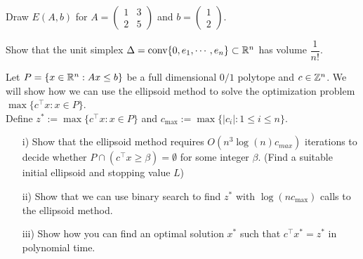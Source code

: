 \documentclass[11pt]{article}
\begin{document}
\problem
Draw $E(A,b)$ for $A = \begin{pmatrix} 1 & 3  \\ 2 & 5 \end{pmatrix}$ and $b  = \begin{pmatrix} 1   \\ 2 \end{pmatrix}$.

\problem
Show that the unit simplex $\Delta = \text{conv} \{ 0, e_1, \cdots, e_n \} \subset \mathbb{R}^{n}$ has volume $\dfrac{1}{n!}$.

\problem
Let $P = \{ x \in \mathbb{R}^{n} : Ax \leq b \}$ be a full dimensional $0/1$ polytope and $c \in \mathbb{Z}^n$. 	We will show how we can use the ellipsoid method to solve the optimization problem $\max \{  c^{\top} x : x \in P \}$. \\
	
\noindent Define $z^* := \max \{ c^{\top} x : x \in P \}$ and $c_{\max} := \max \{ |c_i| : 1 \leq i \leq n \}$. 

\begin{enumerate}
\item[i)] Show that the ellipsoid method requires $O(n^3 \log (n) c_{max})$ iterations to decide whether $P \cap  (c^\top x \geq \beta) = \emptyset$ for some integer $\beta$. (Find a suitable initial ellipsoid and stopping value  $L$)
\item[ii)] Show that we can use binary search to find $z^*$ with $\log(n c_{\max})$ calls to the ellipsoid method.
\item[iii)] Show how you can find an optimal solution $x^*$ such that $c^{\top} x^* = z^*$ in polynomial time.
\end{enumerate}
\end{document}
